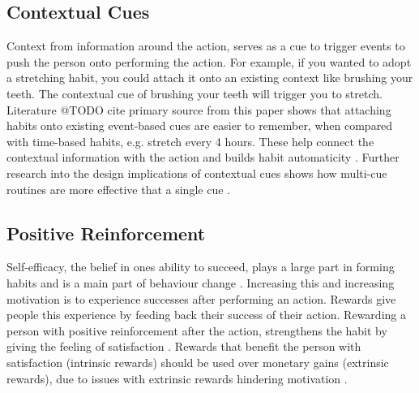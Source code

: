 \subsection*{Contextual Cues}
Context from information around the action, serves as a cue to trigger events to push the person onto performing the action. For example, if you wanted to adopt a stretching habit, you could attach it onto an existing context like brushing your teeth. The contextual cue of brushing your teeth will trigger you to stretch. Literature @TODO cite primary source from this paper \cite{article_beyond_self_tracking_designing_apps} shows that attaching habits onto existing event-based cues are easier to remember, when compared with time-based habits, e.g. stretch every 4 hours. These help connect the contextual information with the action and builds habit automaticity \cite{article_implementation_intentions}. Further research into the design implications of contextual cues shows how multi-cue routines are more effective that a single cue \cite{article_understanding_use_contextual_cues_design_impl}.

\subsection*{Positive Reinforcement}
Self-efficacy, the belief in ones ability to succeed, plays a large part in forming habits and is a main part of behaviour change \cite{article_a_self_efficacy}. Increasing this and increasing motivation is to experience successes after performing an action. Rewards give people this experience by feeding back their success of their action.\newline
\newline
Rewarding a person with positive reinforcement after the action, strengthens the habit by giving the feeling of satisfaction \cite{article_promoting_habit_formation}. Rewards that benefit the person with satisfaction (intrinsic rewards) should be used over monetary gains (extrinsic rewards), due to issues with extrinsic rewards hindering motivation \cite{article_meta_analytic_review_intrinsic_motivation}.

